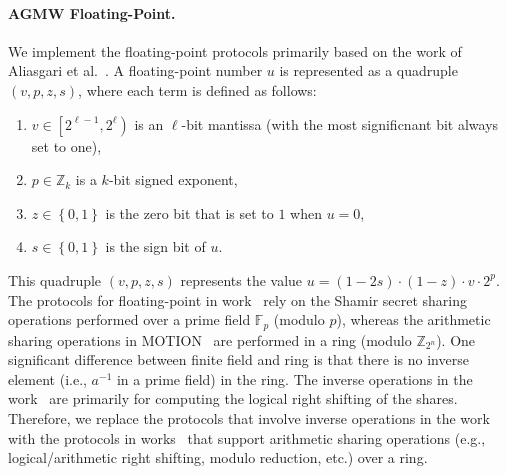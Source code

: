 \paragraph{AGMW Floating-Point.}
\label{para:AGMWFloating-Point}
We implement the \arithmeticGMW floating-point protocols primarily based on the work of Aliasgari et al.~\cite{aliasgari2012secure}.
A floating-point number $u$ is represented as a quadruple $\left(v, p, z, s\right) $, where each term is defined as follows:
\begin{enumerate}
      \item $v\in \left[2^{\ell-1},2^{\ell}\right) $ is an $\ell$-bit mantissa (with the most significnant bit always set to one),
      \item $p\in \mathbb{Z} _k$ is a $k$-bit signed exponent,
      \item $z\in \left\{0,1\right\} $ is the zero bit that is set to $1$ when $u=0$,
      \item $s\in \left\{0,1\right\}$ is the sign bit of $u$.
\end{enumerate}
This quadruple $\left(v, p, z, s\right) $ represents the value $u= \left(1-2s\right) \cdot \left(1-z\right) \cdot v \cdot 2^p$.
The \smpc protocols for floating-point in work~\cite{aliasgari2012secure} rely on the Shamir secret sharing~\cite{shamir1979share} operations performed over a prime field $\mathbb{F}_p$ (modulo $p$), whereas the arithmetic sharing operations in MOTION~\cite{braun2022motion} are performed in a ring (modulo $\mathbb{Z} _{2^{n}}$). One significant difference between finite field and ring is that there is no inverse element (i.e., $a^{-1}$ in a prime field) in the ring. The inverse operations in the work~\cite{aliasgari2012secure} are primarily for computing the logical right shifting of the shares.
Therefore, we replace the protocols that involve inverse operations in the work~\cite{aliasgari2012secure} with the \smpc protocols in works~\cite{escudero2020improved,dalskov2020secure,makri2021rabbit} that support arithmetic sharing operations (e.g., logical/arithmetic right shifting, modulo reduction, etc.) over a ring.

